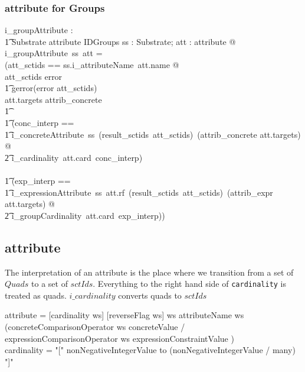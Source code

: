 \documentclass{article}
\def\spec#1{{\tt #1}}
\def\bnf#1{{\scriptsize {{#1}} }}
\begin{document}
\subsubsection{attribute for Groups}

\begin{gendef}
   i\_groupAttribute : \\
\t1 Substrate  \fun attribute \fun IDGroups
\where
   \forall ss : Substrate; att : attribute @ \\
   i\_groupAttribute~ss~att = \\
   (\LET att\_sctids == ss.i\_attributeName~att.name @ \\
   \IF att\_sctids \in \ran error \\
\t1 \THEN gerror(error \inv att\_sctids) \\
   \ELSE \IF att.targets \in \ran attrib\_concrete \\
\t1 \THEN \\
\t1 (\LET conc\_interp == \\
\t1 i\_concreteAttribute~ss~(result\_sctids~att\_sctids)~(attrib\_concrete \inv att.targets) @ \\
\t2 i\_cardinality~att.card~conc\_interp) \\
   \ELSE  \\
\t1 (\LET exp\_interp == \\
\t1 i\_expressionAttribute~ss~att.rf~(result\_sctids~att\_sctids)~(attrib\_expr \inv att.targets) @ \\
\t2 i\_groupCardinality~att.card~exp\_interp))
\end{gendef}



\subsection{attribute}
The interpretation of an attribute is the place where we transition from a set of $Quads$ to a set of $sctIds$.  Everything to
the right hand side of \spec{cardinality} is treated as quads.  $i\_cardinality$ converts quads to $sctIds$

\begin{framed}
\noindent
\bnf{attribute = [cardinality ws] [reverseFlag ws] ws attributeName ws \\
	(concreteComparisonOperator ws concreteValue / \\
	expressionComparisonOperator ws expressionConstraintValue )} \\
\bnf{cardinality = "[" nonNegativeIntegerValue to (nonNegativeIntegerValue / many) "]" }
\end{framed}
\end{document}
